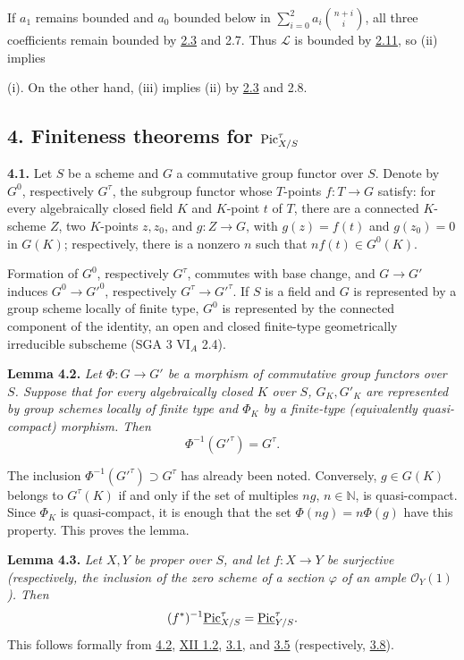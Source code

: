 If \(a_1\) remains bounded and \(a_0\) bounded below in
\(\sum_{i=0}^{2}a_i\binom{n+i}{i}\), all three coefficients remain
bounded by \hyperlink{sga6.e13.lem.2-3}{2.3} and 2.7. Thus \(\mathscr L\) is bounded by \hyperlink{sga6.e13.lem.2-11}{2.11}, so (ii)
implies

(i). On the other hand, (iii) implies (ii) by \hyperlink{sga6.e13.lem.2-3}{2.3} and 2.8.

\subsection*{4. Finiteness theorems for \(\operatorname{Pic}^\tau_{X/S}\)}

\textbf{4.1.} Let \(S\) be a scheme and \(G\) a commutative group functor
over \(S\). Denote by \(G^0\), respectively \(G^\tau\), the subgroup
functor whose \(T\)-points \(f:T\to G\) satisfy: for every algebraically
closed field \(K\) and \(K\)-point \(t\) of \(T\), there are a connected
\(K\)-scheme \(Z\), two \(K\)-points \(z,z_0\), and \(g:Z\to G\), with
\(g(z)=f(t)\) and \(g(z_0)=0\) in \(G(K)\); respectively, there is a
nonzero \(n\) such that \(nf(t)\in G^0(K)\).

Formation of \(G^0\), respectively \(G^\tau\), commutes with base change,
and \(G\to G'\) induces \(G^0\to G'^0\), respectively
\(G^\tau\to G'^\tau\). If \(S\) is a field and \(G\) is represented by a
group scheme locally of finite type, \(G^0\) is represented by the
connected component of the identity, an open and closed finite-type
geometrically irreducible subscheme (SGA 3 VI\(_A\) 2.4).

\textbf{Lemma 4.2.} \emph{Let \(\Phi:G\to G'\) be a morphism of
commutative group functors over \(S\). Suppose that for every
algebraically closed \(K\) over \(S\), \(G_K,G'_K\) are represented by
group schemes locally of finite type and \(\Phi_K\) by a finite-type
(equivalently quasi-compact) morphism. Then}
\[
\Phi^{-1}(G'^\tau)=G^\tau.
\]

The inclusion \(\Phi^{-1}(G'^\tau)\supset G^\tau\) has already been
noted. Conversely, \(g\in G(K)\) belongs to \(G^\tau(K)\) if and only if
the set of multiples \(ng\), \(n\in\mathbb N\), is quasi-compact. Since
\(\Phi_K\) is quasi-compact, it is enough that the set
\(\Phi(ng)=n\Phi(g)\) have this property. This proves the lemma.

\textbf{Lemma 4.3.} \emph{Let \(X,Y\) be proper over \(S\), and let
\(f:X\to Y\) be surjective (respectively, the inclusion of the zero
scheme of a section \(\varphi\) of an ample \(\mathcal O_Y(1)\)). Then}
\[
(f^*)^{-1}\underline{\operatorname{Pic}}^\tau_{X/S}
=\underline{\operatorname{Pic}}^\tau_{Y/S}.
\]
This follows formally from \hyperlink{sga6.e13.lem.4-2}{4.2}, \hyperlink{sga6.e12.cor.1-2}{XII 1.2}, \hyperlink{sga6.e13.lem.3-1}{3.1}, and \hyperlink{sga6.e13.thm.3-5}{3.5} (respectively,
\hyperlink{sga6.e13.thm.3-8}{3.8}).

